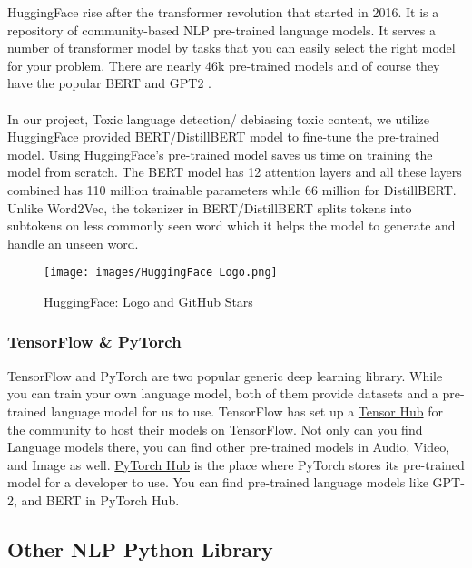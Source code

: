 \documentclass[a4paper, 11pt]{article}
\begin{document}
HuggingFace\cite{DBLP:journals/corr/abs-1910-03771} rise after the transformer revolution that started in 2016. It is a repository of community-based NLP pre-trained language models. It serves a number of transformer model by tasks that you can easily select the right model for your problem. There are nearly 46k pre-trained models and of course they have the popular BERT and GPT2 .\\
\\
In our project, Toxic language detection/ debiasing toxic content, we utilize HuggingFace provided BERT/DistillBERT model to fine-tune the pre-trained model. Using HuggingFace's pre-trained model saves us time on training the model from scratch. The BERT model has 12 attention layers and all these layers combined has 110 million trainable parameters while 66 million for DistillBERT. Unlike Word2Vec, the tokenizer in BERT/DistillBERT splits tokens into subtokens on less commonly seen word which it helps the model to generate and handle an unseen word.\\

\begin{figure}[h]
    \centering
    \texttt{[image: images/HuggingFace Logo.png]}
    \caption{HuggingFace\cite{DBLP:journals/corr/abs-1910-03771}: Logo and GitHub Stars}
    \label{fig:mesh1}
\end{figure}

\subsubsection{TensorFlow \& PyTorch}

TensorFlow\cite{tensorflow2015-whitepaper} and PyTorch\cite{NEURIPS2019_9015} are two popular generic deep learning library. While you can train your own language model, both of them provide datasets and a pre-trained language model for us to use. TensorFlow has set up a  \href{https://tfhub.dev/s?module-type=text-language-model}{Tensor Hub} for the community to host their models on TensorFlow. Not only can you find Language models there, you can find other pre-trained models in Audio, Video, and Image as well. \href{https://pytorch.org/hub/research-models}{PyTorch Hub} is the place where PyTorch stores its pre-trained model for a developer to use. You can find pre-trained language models like GPT-2, and BERT in PyTorch Hub.

\subsection{Other NLP Python Library}
\end{document}
